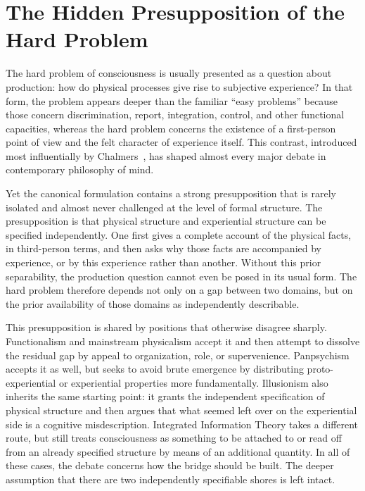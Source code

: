 \documentclass[12pt]{article}
\theoremstyle{definition}
\theoremstyle{remark}
\begin{document}
\clearpage
\tableofcontents
\clearpage

\section{The Hidden Presupposition of the Hard
Problem}\label{the-hidden-presupposition-of-the-hard-problem}

The hard problem of consciousness is usually presented as a question
about production: how do physical processes give rise to subjective
experience? In that form, the problem appears deeper than the familiar
``easy problems'' because those concern discrimination, report,
integration, control, and other functional capacities, whereas the hard
problem concerns the existence of a first-person point of view and the
felt character of experience itself. This contrast, introduced most
influentially by Chalmers~\cite{Chalmers1996}, has shaped almost every major debate in
contemporary philosophy of mind.

Yet the canonical formulation contains a strong presupposition that is
rarely isolated and almost never challenged at the level of formal
structure. The presupposition is that physical structure and
experiential structure can be specified independently. One first gives a
complete account of the physical facts, in third-person terms, and then
asks why those facts are accompanied by experience, or by this
experience rather than another. Without this prior separability, the
production question cannot even be posed in its usual form. The hard
problem therefore depends not only on a gap between two domains, but on
the prior availability of those domains as independently describable.

This presupposition is shared by positions that otherwise disagree
sharply. Functionalism and mainstream physicalism accept it and then
attempt to dissolve the residual gap by appeal to organization, role, or
supervenience. Panpsychism accepts it as well, but seeks to avoid brute
emergence by distributing proto-experiential or experiential properties
more fundamentally. Illusionism also inherits the same starting point:
it grants the independent specification of physical structure and then
argues that what seemed left over on the experiential side is a
cognitive misdescription. Integrated Information Theory takes a
different route, but still treats consciousness as something to be
attached to or read off from an already specified structure by means of
an additional quantity. In all of these cases, the debate concerns how
the bridge should be built. The deeper assumption that there are two
independently specifiable shores is left intact.
\end{document}
